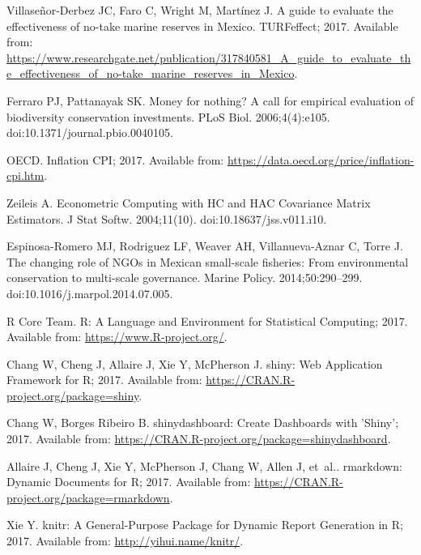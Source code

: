 \documentclass[10pt,letterpaper]{article}
\begin{document}
\begin{thebibliography}{10}
Villaseñor-Derbez JC, Faro C, Wright M, Martínez J.
\newblock A guide to evaluate the effectiveness of no-take marine reserves in
  Mexico.
\newblock TURFeffect; 2017.
\newblock Available from:
  \url{https://www.researchgate.net/publication/317840581\_A\_guide\_to\_evaluate\_the\_effectiveness\_of\_no-take\_marine\_reserves\_in\_Mexico}.

Ferraro PJ, Pattanayak SK.
\newblock Money for nothing? A call for empirical evaluation of biodiversity
  conservation investments.
\newblock PLoS Biol. 2006;4(4):e105.
\newblock doi:{10.1371/journal.pbio.0040105}.

OECD. Inflation {CPI}; 2017.
\newblock Available from: \url{https://data.oecd.org/price/inflation-cpi.htm}.

Zeileis A.
\newblock Econometric Computing with HC and HAC Covariance Matrix Estimators.
\newblock J Stat Softw. 2004;11(10).
\newblock doi:{10.18637/jss.v011.i10}.

Espinosa-Romero MJ, Rodriguez LF, Weaver AH, Villanueva-Aznar C, Torre J.
\newblock The changing role of NGOs in Mexican small-scale fisheries: From
  environmental conservation to multi-scale governance.
\newblock Marine Policy. 2014;50:290--299.
\newblock doi:{10.1016/j.marpol.2014.07.005}.

{R Core Team}. R: A Language and Environment for Statistical Computing; 2017.
\newblock Available from: \url{https://www.R-project.org/}.

Chang W, Cheng J, Allaire J, Xie Y, McPherson J. shiny: Web Application
  Framework for R; 2017.
\newblock Available from: \url{https://CRAN.R-project.org/package=shiny}.

Chang W, {Borges Ribeiro} B. shinydashboard: Create Dashboards with 'Shiny';
  2017.
\newblock Available from:
  \url{https://CRAN.R-project.org/package=shinydashboard}.

Allaire J, Cheng J, Xie Y, McPherson J, Chang W, Allen J, et~al.. rmarkdown:
  Dynamic Documents for R; 2017.
\newblock Available from: \url{https://CRAN.R-project.org/package=rmarkdown}.

Xie Y. knitr: A General-Purpose Package for Dynamic Report Generation in R;
  2017.
\newblock Available from: \url{http://yihui.name/knitr/}.


\end{thebibliography}
\end{document}
